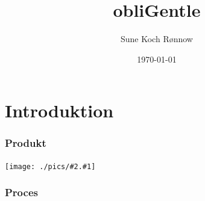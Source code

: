 \documentclass[xcolor={dvipsnames}]{beamer}
\title[Svendeprøve]{obliGentle}
\author{Sune Koch Rønnow}
\institute{Aarhus Tech}
\date{\today}
\newcommand{\pic}[2][png]{
	\begin{center}
	\texttt{[image: ./pics/\#2.\#1]}\\
	\end{center}
}
\begin{document}

\section{Introduktion}

\begin{frame}
\titlepage
\end{frame}

\begin{frame}
\tableofcontents
\end{frame}

\begin{frame}
\frametitle{Produkt}
\pic[jpg]{buddyJesus}
\end{frame}

\begin{frame}
\frametitle{}
\end{frame}

\begin{frame}
\frametitle{}
\end{frame}

\begin{frame}
\frametitle{}
\end{frame}

\begin{frame}
\frametitle{}
\end{frame}

\begin{frame}
\frametitle{Proces}
\end{frame}
\end{document}
